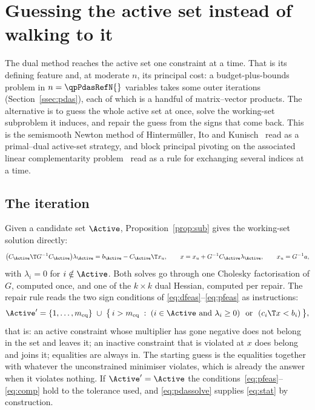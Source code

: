 \section{Guessing the active set instead of walking to it}
\label{sec:pdas}

The dual method reaches the active set one constraint at a time. That is its
defining feature and, at moderate $n$, its principal cost: a budget-plus-bounds
problem in $n = \qpPdasRefN{}$ variables takes some \qpPdasBudgetOuter{} outer
iterations (Section~\ref{ssec:pdas}), each of which is a handful of
matrix--vector products. The alternative is to guess the whole active
set at once, solve the working-set subproblem it induces, and repair the guess
from the signs that come back. This is the semismooth Newton method of
Hinterm\"uller, Ito and Kunisch~\cite{hintermuller2002} read as a primal--dual
active-set strategy, and block principal pivoting on the associated linear
complementarity problem~\cite{judice1994,murty1988,cottle1992} read as a rule for
exchanging several indices at a time.

\subsection{The iteration}

Given a candidate set $\Active$, Proposition~\ref{prop:sub} gives the working-set
solution directly:
\begin{equation}
  \bigl(C_\Active\T G^{-1} C_\Active\bigr)\lambda_\Active
   = b_\Active - C_\Active\T x_u,
  \qquad
  x = x_u + G^{-1}C_\Active \lambda_\Active,
  \qquad x_u = G^{-1}a,
  \label{eq:pdassolve}
\end{equation}
with $\lambda_i = 0$ for $i \notin \Active$. Both solves go through one Cholesky
factorisation of $G$, computed once, and one of the $k \times k$ dual Hessian,
computed per repair. The repair rule reads the two sign conditions of
\eqref{eq:dfeas}--\eqref{eq:pfeas} as instructions:
\begin{equation}
  \Active' = \{1,\dots,m_{\mathrm{eq}}\} \;\cup\;
  \bigl\{\, i > m_{\mathrm{eq}} \;:\;
    (i \in \Active \text{ and } \lambda_i \ge 0)
    \ \text{ or }\
    (c_i\T x < b_i) \,\bigr\},
  \label{eq:repair}
\end{equation}
that is: an active constraint whose multiplier has gone negative does not belong
in the set and leaves it; an inactive constraint that is violated at $x$ does
belong and joins it; equalities are always in. The starting guess is the
equalities together with whatever the unconstrained minimiser violates, which is
already the answer when it violates nothing. If $\Active' = \Active$ the
conditions~\eqref{eq:pfeas}--\eqref{eq:comp} hold to the tolerance used, and
\eqref{eq:pdassolve} supplies \eqref{eq:stat} by construction.

